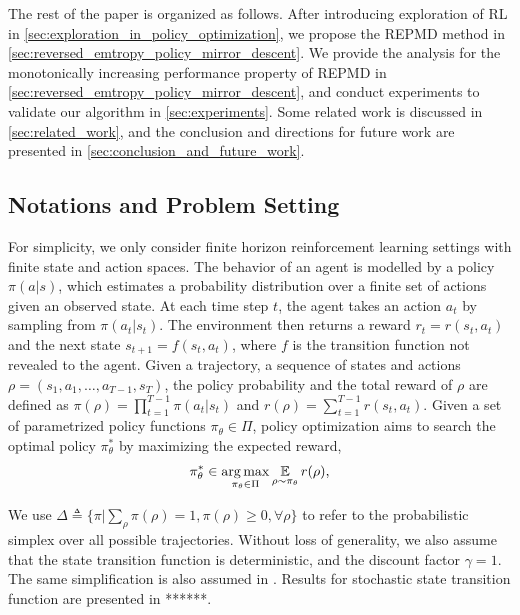 The rest of the paper is organized as follows. After introducing exploration of RL in \cref{sec:exploration_in_policy_optimization}, we propose the REPMD method in \cref{sec:reversed_emtropy_policy_mirror_descent}. We provide the analysis for the monotonically increasing performance property of REPMD in \cref{sec:reversed_emtropy_policy_mirror_descent}, and conduct experiments to validate our algorithm in \cref{sec:experiments}. Some related work is discussed in \cref{sec:related_work}, and the conclusion and directions for future work are presented in \cref{sec:conclusion_and_future_work}.
\fi
\subsection{Notations and Problem Setting}
\label{subsec:notations_and_settings}
For simplicity, we only consider finite horizon reinforcement learning settings with finite state and action spaces. 
The behavior of an agent is modelled by a policy $\pi(a|s)$, which estimates a probability distribution over a finite set of actions given an observed state. 
At each time step $t$, the agent takes an action $a_t$ by sampling from $\pi(a_t | s_t)$. The environment then returns a reward $r_t = r(s_t, a_t)$ and the next state $s_{t+1} = f(s_t, a_t)$, where $f$ is the transition function not revealed to the agent.
Given a trajectory, a sequence of states and actions $\rho=(s_1, a_1, \dots, a_{T-1}, s_T)$, the policy probability and the total reward of $\rho$ are defined as $\pi(\rho) = \prod_{t=1}^{T-1} \pi(a_t| s_t)$ and $r(\rho) = \sum_{t=1}^{T-1} r(s_t, a_t)$. 
Given a set of parametrized policy functions $\pi_\theta \in \Pi$, policy optimization aims to search the optimal policy $\pi_\theta^*$ by maximizing the expected reward,
\begin{equation}
\label{max_expected_reward}
\begin{split}
\pi_\theta^* \in \operatorname*{arg\,max}_{\pi_\theta \in \Pi}{ \operatorname*{\mathbb{E}}\limits_{\rho \sim \pi_\theta}{r(\rho)} },
\end{split}
\end{equation}

We use $\Delta \triangleq \{ \pi | \sum_{\rho}{\pi(\rho)} = 1, \pi(\rho) \ge 0, \forall \rho \}$ to refer to the probabilistic simplex over all possible trajectories. 
Without loss of generality, we also assume that the state transition function is deterministic, and the discount factor $\gamma = 1$.
The same simplification is also assumed in \citet{nachum2017improving}. 
Results for stochastic state transition function are presented in ******.